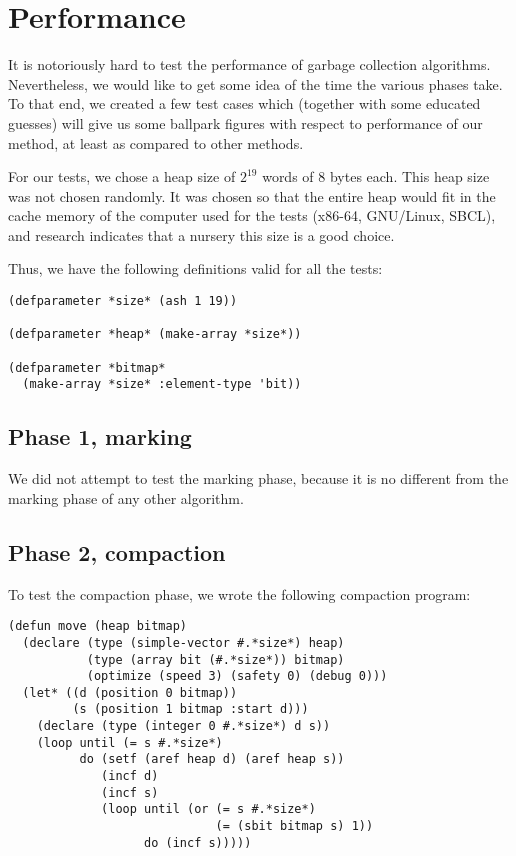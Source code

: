 \section{Performance}

It is notoriously hard to test the performance of garbage collection
algorithms.  Nevertheless, we would like to get some idea of the time
the various phases take.  To that end, we created a few test cases
which (together with some educated guesses) will give us some ballpark
figures with respect to performance of our method, at least as
compared to other methods. 

For our tests, we chose a heap size of $2^{19}$ words of $8$ bytes
each.  This heap size was not chosen randomly.  It was chosen so that
the entire heap would fit in the cache memory of the computer used for
the tests (x86-64, GNU/Linux, SBCL), and research
\cite{Marlow:2011:MGC:2076022.1993482} indicates that a nursery this
size is a good choice.

Thus, we have the following definitions valid for all the tests:

{\small\begin{verbatim}
(defparameter *size* (ash 1 19))

(defparameter *heap* (make-array *size*))

(defparameter *bitmap*
  (make-array *size* :element-type 'bit))
\end{verbatim}}


\subsection{Phase 1, marking}

We did not attempt to test the marking phase, because it is no
different from the marking phase of any other algorithm.

\subsection{Phase 2, compaction}

To test the compaction phase, we wrote the following compaction
program:

{\small\begin{verbatim}
(defun move (heap bitmap)
  (declare (type (simple-vector #.*size*) heap)
           (type (array bit (#.*size*)) bitmap)
           (optimize (speed 3) (safety 0) (debug 0)))
  (let* ((d (position 0 bitmap))
         (s (position 1 bitmap :start d)))
    (declare (type (integer 0 #.*size*) d s))
    (loop until (= s #.*size*)
          do (setf (aref heap d) (aref heap s))
             (incf d)
             (incf s)
             (loop until (or (= s #.*size*)
                             (= (sbit bitmap s) 1))
                   do (incf s)))))
\end{verbatim}}

